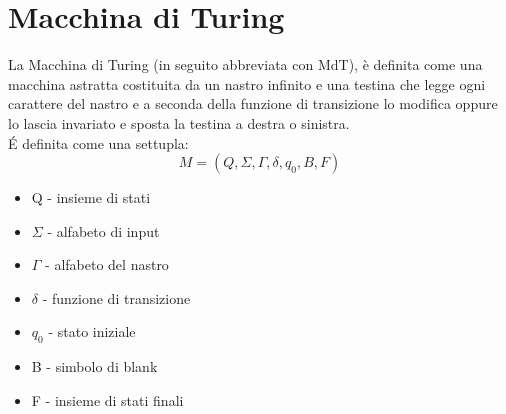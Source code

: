 \chapter{Macchina di Turing}
La Macchina di Turing (in seguito abbreviata con MdT), è definita come
una macchina astratta costituita da un nastro infinito e una testina che
legge ogni carattere del nastro e a seconda della funzione di transizione lo
modifica oppure lo lascia invariato e sposta la testina a destra o sinistra.
\\\'E definita come una settupla:
\begin{equation}
    M=(Q,\Sigma,\Gamma,\delta,q_0,B,F)
\end{equation} 
\begin{itemize}
    \item Q - insieme di stati
    \item $\Sigma$ - alfabeto di input
    \item $\Gamma$ - alfabeto del nastro
    \item $\delta$ - funzione di transizione
    \item $q_0$ - stato iniziale
    \item B - simbolo di blank
    \item F - insieme di stati finali
\end{itemize}
